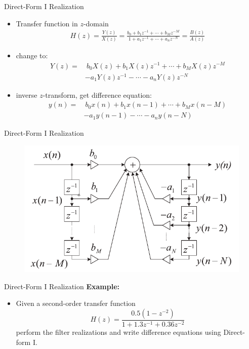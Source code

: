 \documentclass[pdflatex,compress,mathserif]{beamer}
\begin{document}
\begin{frame}{Direct-Form I Realization}
	\begin{itemize}
		\item Transfer function in $z$-domain
		\begin{align*}
			H(z) = \frac{Y(z)}{X(z)} = \frac{b_0 + b_1z^{-1} + \cdots + b_M z^{-M}}{1 + a_1z^{-1} + \cdots + a_n z^{-N}} = \frac{B(z)}{A(z)}
		\end{align*}
		\item change to:
		\begin{align*}
			Y(z) = &~ b_0 X(z) + b_1 X(z)z^{-1} + \cdots + b_M X(z)z^{-M}\\
				   & -a_1Y(z)z^{-1} - \cdots - a_n Y(z)z^{-N}
		\end{align*}
		\item inverse $z$-transform, get difference equation:
		\begin{align*}
			y(n) = &~ b_0 x(n) + b_1 x(n-1) + \cdots +b_Mx(n-M)\\
				   & -a_1y(n-1) - \cdots - a_ny(n-N)
		\end{align*}
	\end{itemize}
\end{frame}

\begin{frame}{Direct-Form I Realization}
		\begin{figure}
      \centering
			\includegraphics[width=\linewidth]{./img/img03.png}
		\end{figure}
\end{frame}

\begin{frame}{Direct-Form I Realization}
  \textbf{Example:}
  \begin{itemize}
    \item Given a second-order transfer function $$ H(z) = \frac{0.5(1-z^{-2})}{1 + 1.3z^{-1} + 0.36 z^{-2}} $$ perform the filter realizations and write difference equations using Direct-form I.
  \end{itemize}
\end{frame}
\end{document}
